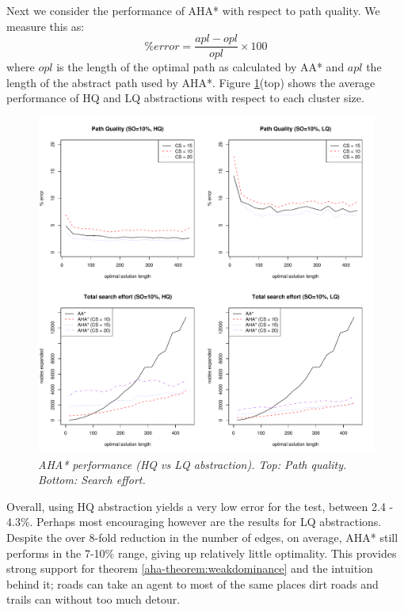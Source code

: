 \par \indent
Next we consider the performance of AHA* with respect to path quality. We measure this as:
$$ \%error = \frac{apl - opl}{opl} \times 100 $$ where $opl$ is the length of the optimal path as calculated by AA* and $apl$ the length of the abstract path used by AHA*.
Figure \ref{aha-fig:allgraphs}(top) shows the average performance of HQ and LQ abstractions with respect to each cluster size. 
\begin{figure}[htbp]
       \caption{\small{\emph{AHA* performance (HQ vs LQ abstraction). Top: Path quality. Bottom: Search effort. }}}
       \begin{center}
                       \includegraphics[scale=0.35]{diagrams/allgraphs.pdf}
       \end{center}
       \label{aha-fig:allgraphs}
\end{figure}
Overall, using HQ abstraction yields a very low error for the test, between 2.4 - 4.3\%. 
Perhaps most encouraging however are the results for LQ abstractions. 
Despite the over 8-fold reduction in the number of edges, on average, AHA* still performs in the 7-10\% range, giving up relatively little optimality. 
This provides strong support for theorem \ref{aha-theorem:weakdominance} and the intuition behind it; roads can take an agent to most of the same places dirt roads and trails can without too much detour.
